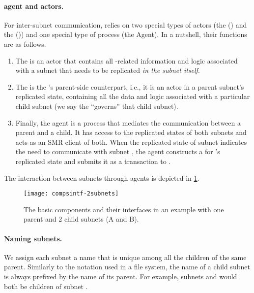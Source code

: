 \paragraph{\ipc agent and actors.}
For inter-subnet communication, \ipc relies on two special types of actors (the \gwFull (\gw) and the \saFull (\sa)) and one special type of process (the \ipc Agent).
In a nutshell, their functions are as follows.
\begin{enumerate}
    \item The \gw is an actor that contains all \ipc-related information and logic associated with a subnet that needs to be replicated \emph{in the subnet itself}.
    \item The \sa is the \gw's parent-side counterpart, i.e., it is an actor in a parent subnet's replicated state,
    containing all the data and logic associated with a particular child subnet (we say the \sa ``governs'' that child subnet).
    \item Finally, the \ipc agent is a process that mediates the communication between a parent and a child.
    It has access to the replicated states of both subnets and acts as an SMR client of both.
    When the replicated state of subnet  indicates the need to communicate with subnet ,
    the \ipc agent constructs a \pof for 's replicated state and submits it as a transaction to .
\end{enumerate}
The interaction between subnets through \ipc agents is depicted in \cref{fig:interfaces}.

\begin{figure}[ht]
     \centering
     \texttt{[image: compsintf-2subnets]}
     \caption{The basic \ipc components and their interfaces in an example with one parent and 2 child subnets (A and B). }
     \label{fig:interfaces}
 \end{figure}

\paragraph{Naming subnets.}
We assign each subnet a name that is unique among all the children of the same parent.
Similarly to the notation used in a file system, the name of a child subnet is always prefixed by the name of its parent.
For example, subnets  and  would both be children of subnet .

